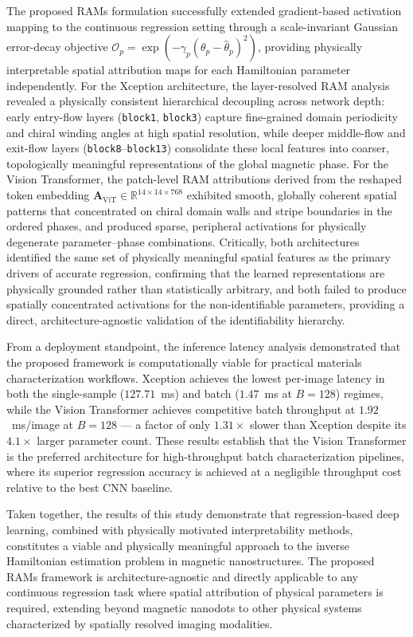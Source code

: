 \documentclass[final,5p,times,twocolumn]{elsarticle}
\begin{document}
The proposed RAMs formulation successfully
extended gradient-based activation mapping to the continuous
regression setting through a scale-invariant Gaussian error-decay
objective $\mathcal{O}_p = \exp(-\gamma_p(\theta_p -
\hat{\theta}_p)^2)$, providing physically interpretable spatial
attribution maps for each Hamiltonian parameter independently. For the
Xception architecture, the layer-resolved RAM analysis revealed a
physically consistent hierarchical decoupling across network depth:
early entry-flow layers (\texttt{block1}, \texttt{block3}) capture
fine-grained domain periodicity and chiral winding angles at high
spatial resolution, while deeper middle-flow and exit-flow layers
(\texttt{block8}--\texttt{block13}) consolidate these local features
into coarser, topologically meaningful representations of the global
magnetic phase. For the Vision Transformer, the patch-level RAM
attributions derived from the reshaped token embedding
$\mathbf{A}_{\text{ViT}} \in \mathbb{R}^{14 \times 14 \times 768}$
exhibited smooth, globally coherent spatial patterns that concentrated
on chiral domain walls and stripe boundaries in the ordered phases,
and produced sparse, peripheral activations for physically degenerate
parameter--phase combinations. Critically, both architectures
identified the same set of physically meaningful spatial features as
the primary drivers of accurate regression, confirming that the
learned representations are physically grounded rather than
statistically arbitrary, and both failed to produce spatially
concentrated activations for the non-identifiable parameters,
providing a direct, architecture-agnostic validation of the
identifiability hierarchy.
 
From a deployment standpoint, the inference latency analysis
demonstrated that the proposed framework is computationally viable for
practical materials characterization workflows. Xception achieves the
lowest per-image latency in both the single-sample ($127.71$~ms) and
batch ($1.47$~ms at $B = 128$) regimes, while the Vision Transformer
achieves competitive batch throughput at $1.92$~ms/image at $B = 128$
--- a factor of only $1.31\times$ slower than Xception despite its
$4.1\times$ larger parameter count. These results establish that the
Vision Transformer is the preferred architecture for high-throughput
batch characterization pipelines, where its superior regression
accuracy is achieved at a negligible throughput cost relative to the
best CNN baseline.
 
Taken together, the results of this study demonstrate that
regression-based deep learning, combined with physically motivated
interpretability methods, constitutes a viable and physically
meaningful approach to the inverse Hamiltonian estimation problem in
magnetic nanostructures. The proposed RAMs framework is
architecture-agnostic and directly applicable to any continuous
regression task where spatial attribution of physical parameters is
required, extending beyond magnetic nanodots to other physical systems
characterized by spatially resolved imaging modalities.
 
\end{document}
